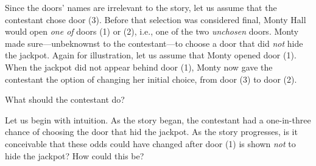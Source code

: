 \smallskip

Since the doors' names are irrelevant to the story, let us assume that the contestant chose door (3).  Before that selection was considered final, Monty Hall would open {\em one of} doors (1) or (2), i.e., one of the two {\em unchosen} doors.  Monty made sure---unbeknownst to the contestant---to choose a door that did {\em not} hide the jackpot.  Again for illustration, let us assume that Monty opened door (1).  When the jackpot did not appear  behind door (1), Monty now gave the contestant the option of changing her initial choice, from door (3) to door (2).

\medskip

What should the contestant do?  

\medskip

Let us begin with intuition.  As the story began, the contestant had a one-in-three chance of choosing the door that hid the jackpot.  As the story progresses, is it conceivable that these odds could have changed after door (1) is shown {\em not} to hide the jackpot?  How could this be?

\smallskip

